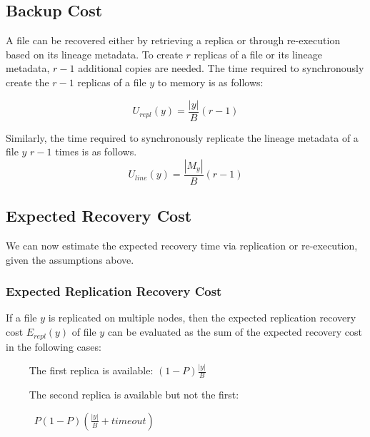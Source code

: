 \documentclass{sig-alternate}
\newcommand{\katznote}[1]{ {\textcolor{blue}    { ***Dan:      #1 }}}
\newcommand{\kylenote}[1]{{\textcolor{orange}    { ***Kyle:      #1 }}}
\newcommand{\katznote}[1]{}
\newcommand{\kylenote}[1]{}
\begin{document}
\subsection{Backup Cost}
A file can be recovered either by retrieving a replica or through re-execution based on its lineage metadata.  To create $r$ replicas of a file or its lineage metadata, $r-1$ additional copies are needed.  The time required to synchronously create the $r-1$ replicas of a file $y$ to memory is as follows:

\begin{equation}
U_{repl}(y) = \frac{|y|}{B} (r-1)
\end{equation}

Similarly, the time required to synchronously replicate the lineage metadata of a file $y$ $r-1$ times is as follows.
\begin{equation}
U_{line}(y) = \frac{|M_{y}|}{B} (r-1)
\end{equation}

\subsection{Expected Recovery Cost}

We can now estimate the expected recovery time via replication or re-execution, given the assumptions above.

\subsubsection{Expected Replication Recovery Cost}
If a file $y$ is replicated on multiple nodes,
then the expected replication recovery cost $E_{repl}(y)$ of file $y$ can be evaluated as the sum
of the expected recovery cost in the following cases:

\noindent ~~~~ The first replica is available: $(1-P)\frac{|y|}{B}$

\noindent ~~~~ The second replica is available but not the first:\\

\vspace{-2ex}

~~~~~ $P(1-P)\left(\frac{|y|}{B}+timeout\right)$
\end{document}
